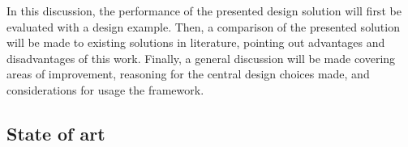 In this discussion, the performance of the presented design solution will first be evaluated with a design example. Then, a comparison of the presented solution will be made to existing solutions in literature, pointing out advantages and disadvantages of this work. Finally, a general discussion will be made covering areas of improvement, reasoning for the central design choices made, and considerations for usage the framework.

\subsection{State of art}
